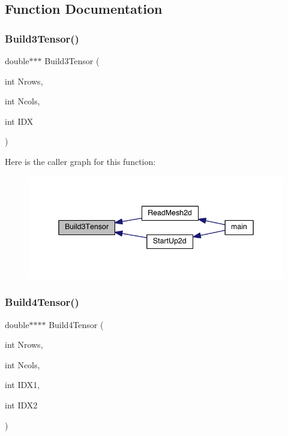 \subsection{Function Documentation}
\mbox{\label{a00602_a6031ee45d6b3d95665a885b7128c311c}} 
\subsubsection{\texorpdfstring{Build3\+Tensor()}{Build3Tensor()}}
{\footnotesize\ttfamily double$\ast$$\ast$$\ast$ Build3\+Tensor (\begin{DoxyParamCaption}\item[{int}]{Nrows,  }\item[{int}]{Ncols,  }\item[{int}]{I\+DX }\end{DoxyParamCaption})}

Here is the caller graph for this function\+:\nopagebreak
\begin{figure}[H]
\begin{center}
\leavevmode
\includegraphics[width=342pt]{a00602_a6031ee45d6b3d95665a885b7128c311c_icgraph}
\end{center}
\end{figure}
\mbox{\label{a00602_a745a480f3faf250c87406ddb1d8d0e4f}} 
\subsubsection{\texorpdfstring{Build4\+Tensor()}{Build4Tensor()}}
{\footnotesize\ttfamily double$\ast$$\ast$$\ast$$\ast$ Build4\+Tensor (\begin{DoxyParamCaption}\item[{int}]{Nrows,  }\item[{int}]{Ncols,  }\item[{int}]{I\+D\+X1,  }\item[{int}]{I\+D\+X2 }\end{DoxyParamCaption})}

